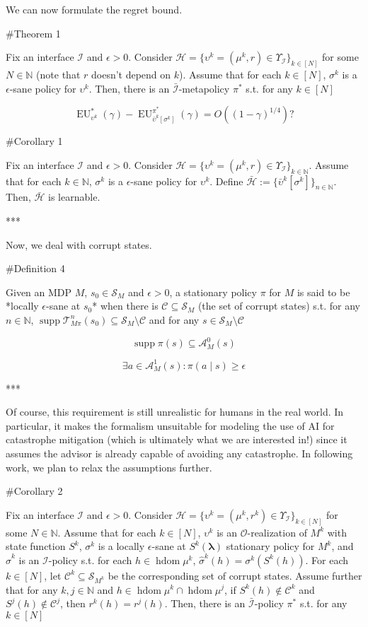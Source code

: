 \documentclass[a4paper]{article}
\DeclareMathOperator{\Supp}{supp}
\newcommand{\Nats}{\mathbb{N}}
\newcommand{\Sq}[2]{\{#1\}_{#2 \in \Nats}}
\newcommand{\Sqn}[1]{\Sq{#1}{n}}
\newcommand{\Estr}{\boldsymbol{\lambda}}
\newcommand{\Ob}{\mathcal{O}}
\newcommand{\A}{\mathcal{A}}
\newcommand{\St}{\mathcal{S}}
\newcommand{\T}{\mathcal{T}}
\newcommand{\In}{\mathcal{I}}
\DeclareMathOperator{\HD}{hdom}
\newcommand{\Hy}{\mathcal{H}}
\newcommand{\Co}{\mathcal{C}}
\newcommand{\EU}{\operatorname{EU}}
\begin{document}
We can now formulate the regret bound.

\#Theorem 1

Fix an interface $\In$ and $\epsilon > 0$. Consider $\Hy = \{\upsilon^k = (\mu^k,r) \in \Upsilon_{\In}\}_{k \in [N]}$ for some $N \in \Nats$ (note that $r$ doesn't depend on $k$). Assume that for each $k \in [N]$, $\sigma^k$ is a $\epsilon$-sane policy for $\upsilon^k$. Then, there is an $\bar{\In}$-metapolicy $\pi^*$ s.t. for any $k \in [N]$

$$\EU_{\upsilon^k}^*(\gamma) - \EU_{\bar{\upsilon}^k\left[\sigma^k\right]}^{\pi^*}(\gamma) = O\left((1-\gamma)^{1/4}\right)?$$

\#Corollary 1

Fix an interface $\In$ and $\epsilon > 0$. Consider $\Hy = \{\upsilon^k = (\mu^k,r) \in \Upsilon_{\In}\}_{k \in \Nats}$. Assume that for each $k \in \Nats$, $\sigma^k$ is a $\epsilon$-sane policy for $\upsilon^k$. Define $\bar{\Hy}:=\Sqn{\bar{\upsilon}^k\left[\sigma^k\right]}$. Then, $\bar{\Hy}$ is learnable.

***

Now, we deal with corrupt states.

\#Definition 4

Given an MDP $M$, $s_0 \in \St_M$ and $\epsilon > 0$, a stationary policy $\pi$ for $M$ is said to be *locally $\epsilon$-sane at $s_0$* when there is $\Co \subseteq \St_M$ (the set of corrupt states) s.t. for any $n \in \Nats$, $\Supp{\T_{M\pi}^n\left(s_0\right)} \subseteq \St_M \setminus \Co$ and for any $s \in \St_M \setminus \Co$

$$\Supp{\pi(s)} \subseteq \A_M^0(s)$$

$$\exists a \in \A_M^1(s): \pi(a \mid s) \geq \epsilon$$

***

Of course, this requirement is still unrealistic for humans in the real world. In particular, it makes the formalism unsuitable for modeling the use of AI for catastrophe mitigation (which is ultimately what we are interested in!) since it assumes the advisor is already capable of avoiding any catastrophe. In following work, we plan to relax the assumptions further.

\#Corollary 2

Fix an interface $\In$ and $\epsilon > 0$. Consider $\Hy = \{\upsilon^k = (\mu^k,r^k) \in \Upsilon_{\In}\}_{k \in [N]}$ for some $N \in \Nats$. Assume that for each $k \in [N]$, $\upsilon^k$ is an $\Ob$-realization of $M^k$ with state function $S^k$, $\sigma^k$ is a locally $\epsilon$-sane at $S^k(\Estr)$ stationary policy for $M^k$, and $\hat{\sigma}^k$ is an $\In$-policy s.t. for each $h \in \HD{\mu^k}$, $\hat{\sigma}^k(h)=\sigma^k\left(S^k(h)\right)$. For each $k \in [N]$, let $\Co^k \subseteq \St_{M^k}$ be the corresponding set of corrupt states. Assume further that for any $k,j \in \Nats$ and $h \in \HD{\mu^k} \cap \HD{\mu^j}$, if $S^k(h) \not\in \Co^k$ and $S^j(h) \not\in \Co^j$, then $r^k(h)=r^j(h)$. Then, there is an $\bar{\In}$-policy $\pi^*$ s.t. for any $k \in [N]$
\end{document}
